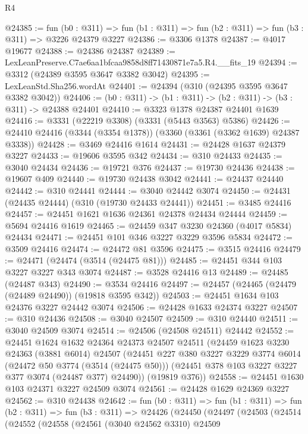 \begin{lexlean}{R4}
\begin{coremodule}
@24385 := fun (b0 : @311) =>
  fun (b1 : @311) => fun (b2 : @311) => fun (b3 : @311) => @3226 @24379 @3227
@24386 := @3306 @1378
@24387 := @4017 @19677
@24388 := @24386 @24387
@24389 := LexLeanPreserve.C7ae6aa1bfcaa9858d8ff71430871e7a5.R4.__fits_19
@24394 := @3312 (@24389 @3595 @3647 @3382 @3042)
@24395 := LexLeanStd.Sha256.wordAt
@24401 := @24394 (@310 (@24395 @3595 @3647 @3382 @3042))
@24406 := (b0 : @311) -> (b1 : @311) -> (b2 : @311) -> (b3 : @311) -> @24388 @24401
@24410 := @3323 @1378 @24387 @24401 @1639
@24416 := @3331 (@22219 @3308) (@3331 (@5443 @3563) @5386)
@24426 := @24410 @24416 (@3344 (@3354 @1378)) (@3360 (@3361 (@3362 @1639) @24387 @3338))
@24428 := @3469 @24416 @1614
@24431 := @24428 @1637 @24379 @3227
@24433 := @19606 @3595 @342
@24434 := @310 @24433
@24435 := @3040 @24434
@24436 := @19721 @376
@24437 := @19730 @24436
@24438 := @19607 @409
@24440 := @19730 @24438 @3042
@24441 := @24437 @24440
@24442 := @310 @24441
@24444 := @3040 @24442 @3074
@24450 := @24431 (@24435 @24444) (@310 (@19730 @24433 @24441))
@24451 := @3485 @24416
@24457 := @24451 @1621 @1636 @24361 @24378 @24434 @24444
@24459 := @5694 @24416 @1619
@24465 := @24459 @347 @3230 @24360 (@4017 @5834) @24434
@24471 := @24451 @101 @346 @3227 @3229 @3596 @5834
@24472 := @3509 @24416
@24474 := @24472 @81 @3596
@24475 := @3515 @24416
@24479 := @24471 (@24474 (@3514 (@24475 @81)))
@24485 := @24451 @344 @103 @3227 @3227 @343 @3074
@24487 := @3528 @24416 @13
@24489 := @24485 (@24487 @343)
@24490 := @3534 @24416
@24497 := @24457 (@24465 (@24479 (@24489 @24490)) (@19818 @3595 @342))
@24503 := @24451 @1634 @103 @24376 @3227 @24442 @3074
@24506 := @24428 @1633 @24374 @3227
@24507 := @310 @24436
@24508 := @3040 @24507
@24509 := @310 @24440
@24511 := @3040 @24509 @3074
@24514 := @24506 (@24508 @24511) @24442
@24552 := @24451
    @1624
    @1632
    @24364
    @24373
    @24507
    @24511
    (@24459
      @1623
      @3230
      @24363
      (@3881 @6014)
      @24507
      (@24451
        @227
        @380
        @3227
        @3229
        @3774
        @6014
        (@24472 @50 @3774 (@3514 (@24475 @50)))
        (@24451 @378 @103 @3227 @3227 @377 @3074 (@24487 @377) @24490))
      (@19819 @376))
@24558 := @24451 @1630 @103 @24371 @3227 @24509 @3074
@24561 := @24428 @1629 @24369 @3227
@24562 := @310 @24438
@24642 := fun (b0 : @311) =>
  fun (b1 : @311) =>
  fun (b2 : @311) =>
  fun (b3 : @311) =>
  @24426
    (@24450
      (@24497
        (@24503
          (@24514
            (@24552
              (@24558
                (@24561
                  (@3040 @24562 @3310)
                  @24509

\end{coremodule}
\end{lexlean}
